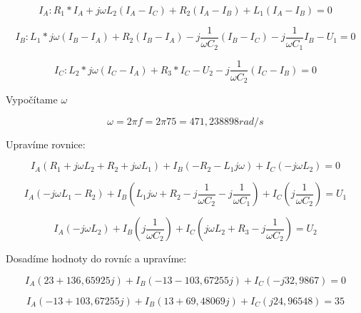 \documentclass[a4paper,12pt]{article}
\begin{document}
\begin{equation*}
I_A: R_1*I_A + j\omega L_2(I_A-I_C)+R_2(I_A-I_B)+L_1(I_A-I_B)=0
\end{equation*}

\begin{equation*}
I_B: L_1*j\omega (I_B-I_A)+R_2(I_B-I_A)-j\frac{1}{\omega C_2}(I_B-I_C)-j\frac{1}{\omega C_1}I_B-U_1 = 0
\end{equation*}

\begin{equation*}
I_C: L_2*j\omega (I_C-I_A)+R_3*I_C - U_2 -j\frac{1}{\omega C_2}(I_C-I_B) = 0
\end{equation*}

\begin{flushleft}
Vypočítame $\omega$
\end{flushleft}

\begin{equation*}
\omega =2\pi f=2\pi 75 = 471,238898 rad/s
\end{equation*}

\begin{flushleft}
Upravíme rovnice:
\end{flushleft}

\begin{equation*}
I_A(R_1 + j\omega L_2 + R_2 +j\omega L_1) + I_B(-R_2-L_1j\omega ) + I_C(-j\omega L_2)=0
\end{equation*}

\begin{equation*}
I_A(-j\omega L_1 - R_2) + I_B(L_1j\omega+R_2-j\frac{1}{\omega C_2}-j\frac{1}{\omega C_1}) + I_C(j\frac{1}{\omega C_2})=U_1
\end{equation*}

\begin{equation*}
I_A(-j\omega L_2) + I_B(j\frac{1}{\omega C_2}) + I_C(j\omega L_2 +R_3-j\frac{1}{\omega C_2})=U_2
\end{equation*}

\newpage
\begin{flushleft}
Dosadíme hodnoty do rovníc a upravíme:
\end{flushleft}

\begin{equation*}
I_A(23+136,65925j) + I_B(-13-103,67255j) + I_C(-j32,9867)=0
\end{equation*}

\begin{equation*}
I_A(-13+103,67255j) + I_B(13+69,48069j) + I_C(j24,96548)=35
\end{equation*}
\end{document}
